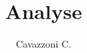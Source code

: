 \documentclass{report}
\title{Analyse}
\author{Cavazzoni C.}
\begin{document}
   \maketitle
   \renewcommand*\contentsname{}
   \tableofcontents{\vspace*{-50cm}}

   \chapter[Chapitre I --- Propriétés des réels]{}
   
   \pagebreak

   \chapter[Chapitre II --- Suites numériques]{}
   
   \pagebreak
\end{document}
